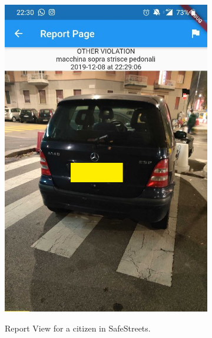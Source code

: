 \documentclass[../RASD.tex]{subfiles}
\begin{document}
    \begin{figure}[H]
        \centering
        \begin{subfigure}{.5\textwidth}
            \centering
            \includegraphics[scale = 0.2]{assets/app_screenshots/citizenReport.png}\\
            \caption[\textit{View Report Citizen} Screenshot]{Report View for a citizen in SafeStreets.}
            \label{fig:sub1}
        \end{subfigure}
        \begin{subfigure}{.5\textwidth}
            \centering

\end{subfigure}
\end{figure}
\end{document}
